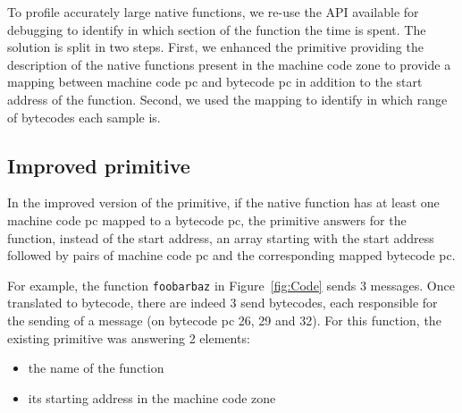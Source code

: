 \documentclass[10pt,preprint,nonatbib]{sigplanconf}
\newcommand{\ct}{\lstinline[backgroundcolor=\color{white},basicstyle=\small\ttfamily]}
\newcommand{\figref}[1]{Figure~\ref{fig:#1}}
\begin{document}
To profile accurately large native functions, we re-use the API available for debugging to identify in which section of the function the time is spent. The solution is split in two steps. First, we enhanced the primitive providing the description of the native functions present in the machine code zone to provide a mapping between machine code pc and bytecode pc in addition to the start address of the function. Second, we used the mapping to identify in which range of bytecodes each sample is.

\subsection{Improved primitive}

In the improved version of the primitive, if the native function has at least one machine code pc mapped to a bytecode pc, the primitive answers for the function, instead of the start address, an array starting with the start address followed by pairs of machine code pc and the corresponding mapped bytecode pc. 

For example, the function \ct{foobarbaz} in \figref{Code} sends 3 messages. Once translated to bytecode, there are indeed 3 send bytecodes, each responsible for the sending of a message (on bytecode pc 26, 29 and 32). For this function, the existing primitive was answering 2 elements: 
\begin{itemize}
	\item the name of the function
	\item its starting address in the machine code zone
\end{itemize}
\end{document}
